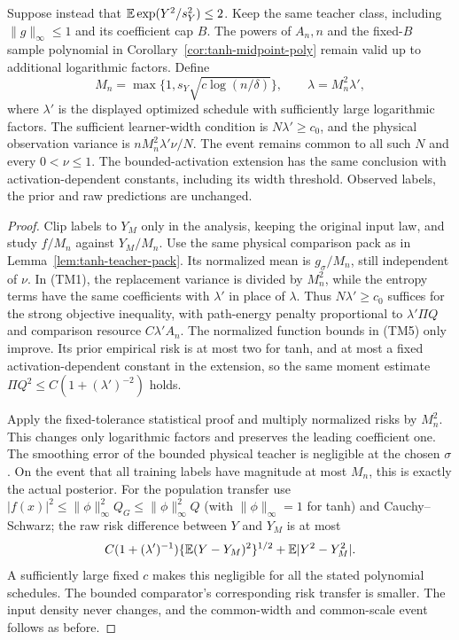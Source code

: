 \begin{corollary}
\label{cor:tanh-midpoint-subgaussian}
Suppose instead that $\mathbb E\exp(Y^2/s_Y^2)\le2$. Keep the same teacher
class, including $\|g\|_\infty\le1$ and its coefficient cap $B$.
The powers of $A_n,n$ and the fixed-$B$ sample polynomial in
Corollary~\ref{cor:tanh-midpoint-poly} remain valid up to additional
logarithmic factors. Define
\[
 M_n=\max\{1,s_Y\sqrt{c\log(n/\delta)}\},\qquad
 \lambda=M_n^2\lambda',
\]
where $\lambda'$ is the displayed optimized schedule with sufficiently
large logarithmic factors. The sufficient learner-width condition is
$N\lambda'\ge c_0$, and the physical observation variance is
$nM_n^2\lambda'\nu/N$. The event remains common to all such $N$
and every $0<\nu\le1$. The bounded-activation extension has the
same conclusion with activation-dependent constants, including its
width threshold. Observed labels, the prior and raw predictions
are unchanged.
\end{corollary}
\begin{proof}
Clip labels to $Y_M$ only in the analysis, keeping the original input
law, and study $f/M_n$ against $Y_M/M_n$. Use the same physical
comparison pack as in Lemma~\ref{lem:tanh-teacher-pack}. Its normalized
mean is $g_\sigma/M_n$, still independent of $\nu$. In (TM1), the
replacement variance is divided by $M_n^2$, while the entropy terms
have the same coefficients with $\lambda'$ in place of $\lambda$.
Thus $N\lambda'\ge c_0$ suffices for the strong objective inequality,
with path-energy penalty proportional to $\lambda'\Pi Q$ and
comparison resource $C\lambda'A_n$. The normalized function bounds
in (TM5) only improve. Its prior empirical risk is at most two for tanh, and at most a fixed
activation-dependent constant in the extension, so the same moment estimate
$\Pi Q^2\le C(1+(\lambda')^{-2})$ holds.

Apply the fixed-tolerance statistical proof and multiply normalized
risks by $M_n^2$. This changes only logarithmic factors and preserves
the leading coefficient one. The smoothing error of the bounded
physical teacher is negligible at the chosen $\sigma$. On the event
that all training labels have magnitude at most $M_n$, this is exactly
the actual posterior. For the population transfer use
$|f(x)|^2\le\|\phi\|_\infty^2 Q_G\le\|\phi\|_\infty^2 Q$
(with $\|\phi\|_\infty=1$ for tanh) and Cauchy--Schwarz; the raw risk difference
between $Y$ and $Y_M$ is at most
\[
 C(1+(\lambda')^{-1})\{\mathbb E(Y-Y_M)^2\}^{1/2}
       +\mathbb E|Y^2-Y_M^2|.
\]
A sufficiently large fixed $c$ makes this negligible for all the
stated polynomial schedules. The bounded comparator's corresponding
risk transfer is smaller. The input density never changes, and the
common-width and common-scale event follows as before.
\end{proof}
